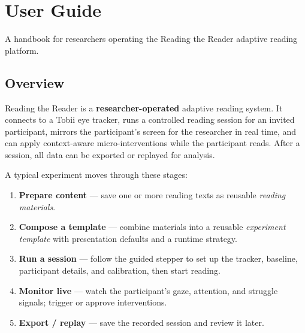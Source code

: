 \providecommand{\tightlist}{\setlength{\itemsep}{0pt}\setlength{\parskip}{0pt}}
\makeatletter{}\makeatother %
\providecommand{\guidescreenshotpending}[1]{\fbox{\parbox[c][3cm][c]{0.9\linewidth}{\centering\itshape Screenshot pending: place the image file at \texttt{#1}.}}}
\captionsetup{list=no}

\chapter{User Guide}\label{app:user-guide}

A handbook for researchers operating the Reading the Reader adaptive reading platform.

\FloatBarrier
\section{Overview}\label{1-overview}

Reading the Reader is a \textbf{researcher-operated} adaptive reading system. It connects to a
Tobii eye tracker, runs a controlled reading session for an invited participant, mirrors the
participant's screen for the researcher in real time, and can apply context-aware
micro-interventions while the participant reads. After a session, all data can be exported or
replayed for analysis.

A typical experiment moves through these stages:

\begin{enumerate}
\def\labelenumi{\arabic{enumi}.}
\tightlist
\item
  \textbf{Prepare content} --- save one or more reading texts as reusable \emph{reading materials}.
\item
  \textbf{Compose a template} --- combine materials into a reusable \emph{experiment template} with
  presentation defaults and a runtime strategy.
\item
  \textbf{Run a session} --- follow the guided stepper to set up the tracker, baseline, participant
  details, and calibration, then start reading.
\item
  \textbf{Monitor live} --- watch the participant's gaze, attention, and struggle signals; trigger or
  approve interventions.
\item
  \textbf{Export / replay} --- save the recorded session and review it later.
\end{enumerate}

